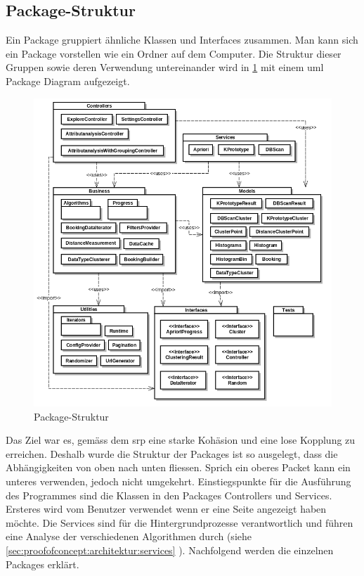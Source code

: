 \subsection{Package-Struktur}
\label{sec:proofofconcept:packagestruktur}
Ein Package gruppiert ähnliche Klassen und Interfaces zusammen. Man kann sich ein Package vorstellen wie ein Ordner auf dem Computer. Die Struktur dieser Gruppen sowie deren Verwendung untereinander wird in \cref{fig:proofofconcept:packagestruktur:1} mit einem \gls{uml} Package Diagram aufgezeigt. 
\begin{figure}[H]
	\RawFloats
	\centering
	\includegraphics[width=1\textwidth]{images/diagram-package-diagram}
	\caption{Package-Struktur}
	\label{fig:proofofconcept:packagestruktur:1}
\end{figure}

Das Ziel war es, gemäss dem \gls{srp} eine starke Kohäsion und eine lose Kopplung zu erreichen. Deshalb wurde die Struktur der Packages ist so ausgelegt, dass die Abhängigkeiten von oben nach unten fliessen. Sprich ein oberes Packet kann ein unteres verwenden, jedoch nicht umgekehrt. Einstiegspunkte für die Ausführung des Programmes sind die Klassen in den Packages Controllers und Services. Ersteres wird vom Benutzer verwendet wenn er eine Seite angezeigt haben möchte. Die Services sind für die Hintergrundprozesse verantwortlich und führen eine Analyse der verschiedenen Algorithmen durch (siehe \cref{sec:proofofconcept:architektur:services} ). Nachfolgend werden die einzelnen Packages erklärt.

